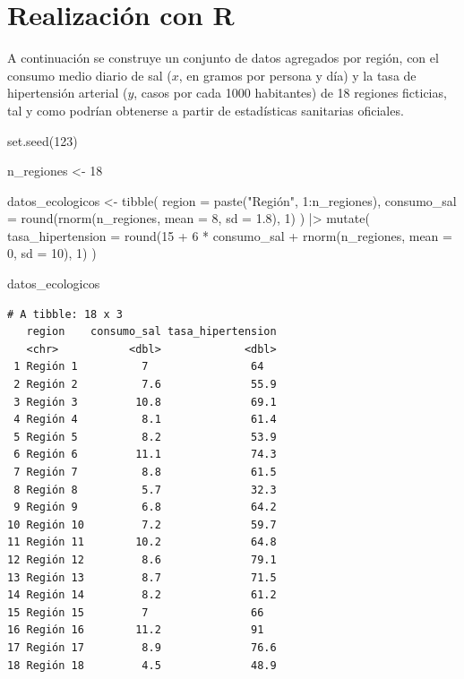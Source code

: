 \documentclass[
  spanish,
  a4paper,
]{scrreport}
\newenvironment{Shaded}{\begin{snugshade}}{\end{snugshade}}
\newcommand{\AttributeTok}[1]{\textcolor[rgb]{0.40,0.45,0.13}{#1}}
\newcommand{\DecValTok}[1]{\textcolor[rgb]{0.68,0.00,0.00}{#1}}
\newcommand{\FloatTok}[1]{\textcolor[rgb]{0.68,0.00,0.00}{#1}}
\newcommand{\FunctionTok}[1]{\textcolor[rgb]{0.28,0.35,0.67}{#1}}
\newcommand{\NormalTok}[1]{\textcolor[rgb]{0.00,0.23,0.31}{#1}}
\newcommand{\OtherTok}[1]{\textcolor[rgb]{0.00,0.23,0.31}{#1}}
\newcommand{\SpecialCharTok}[1]{\textcolor[rgb]{0.37,0.37,0.37}{#1}}
\newcommand{\StringTok}[1]{\textcolor[rgb]{0.13,0.47,0.30}{#1}}
\theoremstyle{definition}
\theoremstyle{definition}
\theoremstyle{remark}
\begin{document}
\section{Realización con R}\label{realizaciuxf3n-con-r-4}

A continuación se construye un conjunto de datos agregados por región,
con el consumo medio diario de sal (\(x\), en gramos por persona y día)
y la tasa de hipertensión arterial (\(y\), casos por cada 1000
habitantes) de 18 regiones ficticias, tal y como podrían obtenerse a
partir de estadísticas sanitarias oficiales.

\begin{Shaded}
\begin{Highlighting}[]
\FunctionTok{set.seed}\NormalTok{(}\DecValTok{123}\NormalTok{)}

\NormalTok{n\_regiones }\OtherTok{\textless{}{-}} \DecValTok{18}

\NormalTok{datos\_ecologicos }\OtherTok{\textless{}{-}} \FunctionTok{tibble}\NormalTok{(}
  \AttributeTok{region =} \FunctionTok{paste}\NormalTok{(}\StringTok{"Región"}\NormalTok{, }\DecValTok{1}\SpecialCharTok{:}\NormalTok{n\_regiones),}
  \AttributeTok{consumo\_sal =} \FunctionTok{round}\NormalTok{(}\FunctionTok{rnorm}\NormalTok{(n\_regiones, }\AttributeTok{mean =} \DecValTok{8}\NormalTok{, }\AttributeTok{sd =} \FloatTok{1.8}\NormalTok{), }\DecValTok{1}\NormalTok{)}
\NormalTok{) }\SpecialCharTok{|\textgreater{}}
  \FunctionTok{mutate}\NormalTok{(}
    \AttributeTok{tasa\_hipertension =} \FunctionTok{round}\NormalTok{(}\DecValTok{15} \SpecialCharTok{+} \DecValTok{6} \SpecialCharTok{*}\NormalTok{ consumo\_sal }\SpecialCharTok{+} \FunctionTok{rnorm}\NormalTok{(n\_regiones, }\AttributeTok{mean =} \DecValTok{0}\NormalTok{, }\AttributeTok{sd =} \DecValTok{10}\NormalTok{), }\DecValTok{1}\NormalTok{)}
\NormalTok{  )}

\NormalTok{datos\_ecologicos}
\end{Highlighting}
\end{Shaded}

\begin{verbatim}
# A tibble: 18 x 3
   region    consumo_sal tasa_hipertension
   <chr>           <dbl>             <dbl>
 1 Región 1          7                64  
 2 Región 2          7.6              55.9
 3 Región 3         10.8              69.1
 4 Región 4          8.1              61.4
 5 Región 5          8.2              53.9
 6 Región 6         11.1              74.3
 7 Región 7          8.8              61.5
 8 Región 8          5.7              32.3
 9 Región 9          6.8              64.2
10 Región 10         7.2              59.7
11 Región 11        10.2              64.8
12 Región 12         8.6              79.1
13 Región 13         8.7              71.5
14 Región 14         8.2              61.2
15 Región 15         7                66  
16 Región 16        11.2              91  
17 Región 17         8.9              76.6
18 Región 18         4.5              48.9
\end{verbatim}
\end{document}

